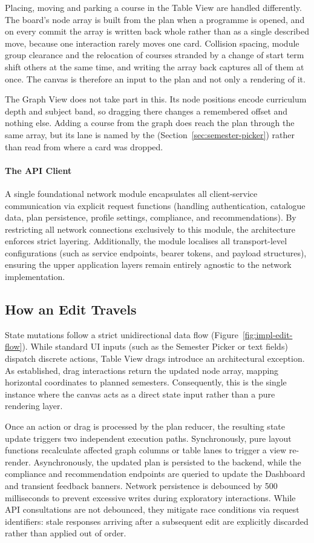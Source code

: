 Placing, moving and parking a course in the Table View are handled differently. The board's node array is built from the plan when a programme is opened, and on every commit the array is written back whole rather than as a single described move, because one interaction rarely moves one card. Collision spacing, module group clearance and the relocation of courses stranded by a change of start term shift others at the same time, and writing the array back captures all of them at once. The canvas is therefore an input to the plan and not only a rendering of it.

The Graph View does not take part in this. Its node positions encode curriculum depth and subject band, so dragging there changes a remembered offset and nothing else. Adding a course from the graph does reach the plan through the same array, but its lane is named by the  (Section~\ref{sec:semester-picker}) rather than read from where a card was dropped.

\paragraph{The API Client}
A single foundational network module encapsulates all client-service communication via explicit request functions (handling authentication, catalogue data, plan persistence, profile settings, compliance, and recommendations). By restricting all network connections exclusively to this module, the architecture enforces strict layering. Additionally, the module localises all transport-level configurations (such as service endpoints, bearer tokens, and payload structures), ensuring the upper application layers remain entirely agnostic to the network implementation.

\subsection{How an Edit Travels}
State mutations follow a strict unidirectional data flow (Figure~\ref{fig:impl-edit-flow}). While standard UI inputs (such as the Semester Picker or text fields) dispatch discrete actions, Table View drags introduce an architectural exception. As established, drag interactions return the updated node array, mapping horizontal coordinates to planned semesters. Consequently, this is the single instance where the canvas acts as a direct state input rather than a pure rendering layer.

Once an action or drag is processed by the plan reducer, the resulting state update triggers two independent execution paths. Synchronously, pure layout functions recalculate affected graph columns or table lanes to trigger a view re-render. Asynchronously, the updated plan is persisted to the backend, while the compliance and recommendation endpoints are queried to update the Dashboard and transient feedback banners. Network persistence is debounced by 500 milliseconds to prevent excessive writes during exploratory interactions. While API consultations are not debounced, they mitigate race conditions via request identifiers: stale responses arriving after a subsequent edit are explicitly discarded rather than applied out of order.

